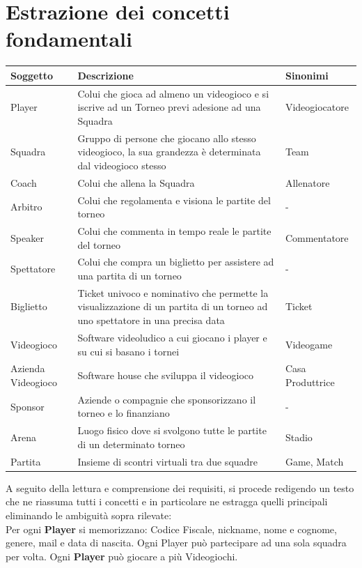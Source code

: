 \documentclass[a4paper,12pt]{report}
\begin{document}
\section{Estrazione dei concetti fondamentali}
\renewcommand{\arraystretch}{1.5}
\setlength{\arrayrulewidth}{0.5mm}
\begin{tabular}{|m{2cm}|m{8cm}|m{3cm}|}
	\hline\rowcolor{pink}
	Soggetto & Descrizione & Sinonimi\\
	\hline\hline
	Player & Colui che gioca ad almeno un videogioco e si iscrive ad un Torneo previ adesione ad una Squadra & Videogiocatore\\
	\hline
	Squadra & Gruppo di persone che giocano allo stesso videogioco, la sua grandezza è determinata dal videogioco stesso & Team\\
	\hline
	Coach & Colui che allena la Squadra & Allenatore\\
	\hline
	Arbitro & Colui che regolamenta e visiona le partite del torneo & -\\
	\hline
	Speaker & Colui che commenta in tempo reale le partite del torneo & Commentatore\\
	\hline
	Spettatore & Colui che compra un biglietto per assistere ad una partita di un torneo & -\\
	\hline
	Biglietto  & Ticket univoco e nominativo che permette la visualizzazione di un partita di un torneo ad uno spettatore in una precisa data & Ticket\\
	\hline
	Videogioco & Software videoludico a cui giocano i player e su cui si basano i tornei & Videogame\\
	\hline
	Azienda Videogioco & Software house che sviluppa il videogioco & Casa Produttrice\\
	\hline
	Sponsor & Aziende o compagnie che sponsorizzano il torneo e lo finanziano & -\\
	\hline
	Arena & Luogo fisico dove si svolgono tutte le partite di un determinato torneo & Stadio\\
	\hline
	Partita & Insieme di scontri virtuali tra due squadre & Game, Match\\
	\hline
\end{tabular}

A seguito della lettura e comprensione dei requisiti, si procede redigendo un testo che ne
riassuma tutti i concetti e in particolare ne estragga quelli principali eliminando le ambiguità
sopra rilevate:\\

Per ogni \textbf{Player} si memorizzano: Codice Fiscale, nickname, nome e cognome, genere, mail e data di nascita. Ogni Player può partecipare ad una sola squadra per volta. Ogni \textbf{Player} può giocare a più Videogiochi.
\end{document}

